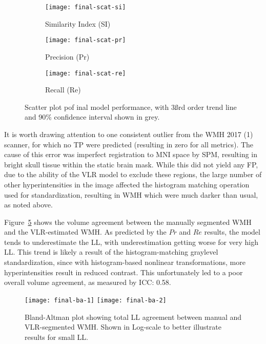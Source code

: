 \begin{figure}
  \centering
  \begin{subfigure}{0.32\textwidth}
    \centering
    \texttt{[image: final-scat-si]}
    \caption{Similarity Index (SI)}%
    \label{fig:seg-final-scat-si}
  \end{subfigure}
  \begin{subfigure}{0.32\textwidth}
    \centering
    \texttt{[image: final-scat-pr]}
    \caption{Precision (Pr)}%
    \label{fig:seg-final-scat-pr}
  \end{subfigure}
  \begin{subfigure}{0.32\textwidth}
    \centering
    \texttt{[image: final-scat-re]}
    \caption{Recall (Re)}%
    \label{fig:seg-final-scat-re}
  \end{subfigure}
  \caption{Scatter plot pof inal model performance, with 3\ss{rd} order trend line
    and 90\% confidence interval shown in grey.}%
  \label{fig:seg-final-scat}
\end{figure}
It is worth drawing attention to one consistent outlier from the WMH 2017 (1) scanner,
for which no TP were predicted (resulting in zero for all metrics).
The cause of this error was imperfect registration to MNI space by SPM,
resulting in bright skull tissue within the static brain mask.
While this did not yield any FP, due to the ability of the VLR model to exclude these regions,
the large number of other hyperintensities in the image
affected the histogram matching operation used for standardization,
resulting in WMH which were much darker than usual, as noted above.
\par
Figure~\ref{fig:ba-final} shows the volume agreement between
the manually segmented WMH and the VLR-estimated WMH.
As predicted by the $Pr$ and $Re$ results, %
the model tends to underestimate the LL,
with underestimation getting worse for very high LL.
This trend is likely a result of the histogram-matching graylevel standardization,
since with histogram-based nonlinear transformations,
more hyperintensities result in reduced contrast.
This unfortunately led to a poor overall volume agreement, as measured by ICC: 0.58.
\par
\begin{figure}
  \centering
  \texttt{[image: final-ba-1]}
  \texttt{[image: final-ba-2]}
  \caption{Bland-Altman plot showing total LL agreement between manual and VLR-segmented WMH.
    Shown in Log-scale to better illustrate results for small LL.}%
  \label{fig:ba-final}
\end{figure}
